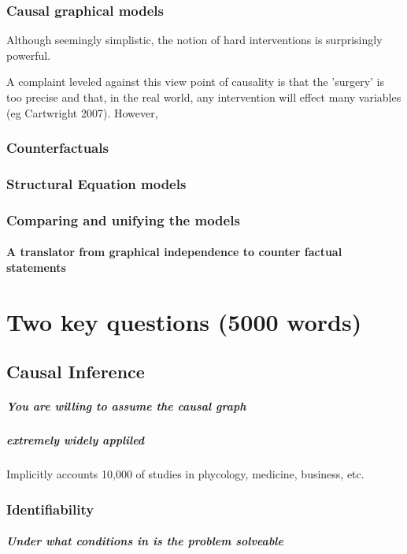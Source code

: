 \documentclass[11pt,a4paper]{book}
\begin{document}
\subsection*{Causal graphical models}
Although seemingly simplistic, the notion of hard interventions is surprisingly powerful. 

A complaint leveled against this view point of causality is that the 'surgery' is too precise and that, in the real world, any intervention will effect many variables (eg Cartwright 2007). However, 

\subsection*{Counterfactuals}
\subsection*{Structural Equation models}
\subsection*{Comparing and unifying the models}
\subsubsection{A translator from graphical independence to counter factual statements}


\chapter*{Two key questions (5000 words)}
\section*{Causal Inference} 
\paragraph*{You are willing to assume the causal graph}
\paragraph*{extremely widely appliled} Implicitly accounts 10,000 of studies in phycology, medicine, business, etc. 

\subsection*{Identifiability}
\paragraph*{Under what conditions in is the problem solveable}
\end{document}
